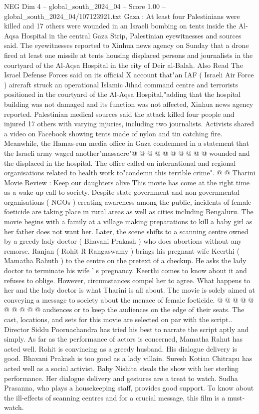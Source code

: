 \begin{textsample}{NEG Dim 4 – global\_south\_2024\_04 – Score 1.00 – global\_south\_2024\_04/107123921.txt}  \label{ex:f4_neg_199}
Gaza : At least four Palestinians were killed and 17 others were wounded in an Israeli bombing on tents inside the Al-Aqsa Hospital in the central Gaza Strip, Palestinian eyewitnesses and sources said.
The eyewitnesses reported to Xinhua news agency on Sunday that a drone fired at least one missile at tents housing displaced persons and journalists in the courtyard of the Al-Aqsa Hospital in the city of Deir al-Balah.
Also Read The Israel Defense Forces said on its official X account that"an IAF ( Israeli Air Force ) aircraft struck an operational Islamic Jihad command centre and terrorists positioned in the courtyard of the Al-Aqsa Hospital,"adding that the hospital building was not damaged and its function was not affected, Xinhua news agency reported.
Palestinian medical sources said the attack killed four people and injured 17 others with varying injuries, including two journalists.
Activists shared a video on Facebook showing tents made of nylon and tin catching fire.
Meanwhile, the Hamas-run media office in Gaza condemned in a statement that the Israeli army waged another"massacre"@ @ @ @ @ @ @ @ @ @ wounded and the displaced in the hospital.
The office called on international and regional organisations related to health work to"condemn this terrible crime". @ @ Tharini Movie Review : Keep our daughters alive This movie has come at the right time as a wake-up call to society.
Despite state government and non-governmental organisations ( NGOs ) creating awareness among the public, incidents of female foeticide are taking place in rural areas as well as cities including Bengaluru.
The movie begins with a family at a village making preparations to kill a baby girl as her father does not want her.
Later, the scene shifts to a scanning centre owned by a greedy lady doctor ( Bhavani Prakash ) who does abortions without any remorse.
Ranjan ( Rohit R Rangaswamy ) brings his pregnant wife Keerthi ( Mamatha Rahuth ) to the centre on the pretext of a checkup.
He asks the lady doctor to terminate his wife ' s pregnancy.
Keerthi comes to know about it and refuses to oblige.
However, circumstances compel her to agree.
What happens to her and the lady doctor is what Tharini is all about.
The movie is solely aimed at conveying a message to society about the menace of female foeticide. @ @ @ @ @ @ @ @ @ @ audiences or to keep the audiences on the edge of their seats.
The cast, locations, and sets for this movie are selected on par with the script..
Director Siddu Poornachandra has tried his best to narrate the script aptly and simply.
As far as the performance of actors is concerned, Mamatha Rahut has acted well.
Rohit is convincing as a greedy husband.
His dialogue delivery is good.
Bhavani Prakash is too good as a lady villain.
Suresh Kotian Chitrapu has acted well as a social activist.
Baby Nishita steals the show with her sterling performance.
Her dialogue delivery and gestures are a treat to watch.
Sudha Prasanna, who plays a housekeeping staff, provides good support.
To know about the ill-effects of scanning centres and for a crucial message, this film is a must-watch.

\end{textsample}
